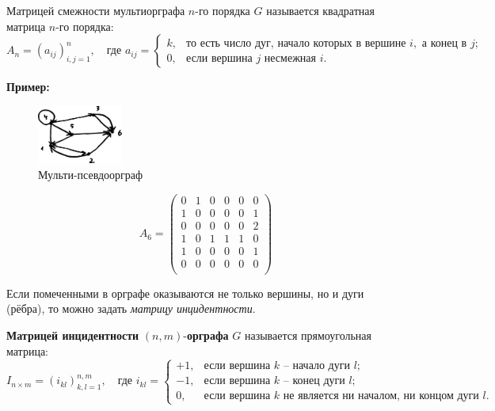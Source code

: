 \documentclass[12pt, a4paper]{article}
\begin{document}
Матрицей смежности мультиорграфа $n$-го порядка $G$ называется квадратная матрица $n$-го порядка:
\[A_n = \left( a_{ij} \right)_{i,j=1}^{n}, \quad \textrm{где } a_{ij} = \begin{cases} k, & \textrm{то есть число дуг, начало которых в вершине } i, \textrm{ а конец в } j; \\ 0, & \textrm{если вершина } j \textrm{ несмежная } i. \end{cases} \]

\newpage

\textbf{Пример:}

\begin{figure}
  \vspace{-13mm}
  \centering
  \includegraphics[width=0.25\textwidth]{47}
  \vspace{-8mm}
 \caption{Мульти-псевдоорграф}
\end{figure}

\[A_6 = \begin{pmatrix}
0 & 1 & 0 & 0 & 0 & 0 \\
1 & 0 & 0 & 0 & 0 & 1 \\
0 & 0 & 0 & 0 & 0 & 2 \\
1 & 0 & 1 & 1 & 1 & 0 \\
1 & 0 & 0 & 0 & 0 & 1 \\
0 & 0 & 0 & 0 & 0 & 0 \\
\end{pmatrix} \]

Если помеченными в орграфе оказываются не только вершины, но и дуги (рёбра), то можно задать \textit{матрицу инцидентности}.

\textbf{Матрицей инцидентности} $(n,m)$-\textbf{орграфа} $G$ называется прямоугольная матрица:
\[I_{n \times m} = \left( i_{kl} \right)_{k,l=1}^{n,m}, \quad \textrm{где } i_{kl} = \begin{cases} +1, & \textrm{если вершина } k \textrm{ -- начало дуги } l; \\ -1, & \textrm{если вершина } k \textrm{ -- конец дуги } l; \\ 0, & \textrm{если вершина } k \textrm{ не является ни началом, ни концом дуги } l. \end{cases} \]
\end{document}
